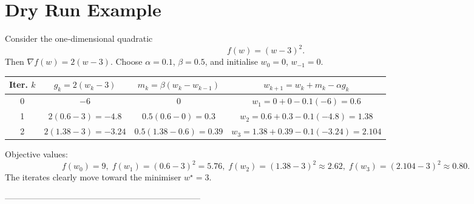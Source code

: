 \documentclass[11pt]{article}
\newcommand{\grad}{\nabla}
\begin{document}
\section*{Dry Run Example}
Consider the one‑dimensional quadratic
\[
f(w)=(w-3)^2 .
\]
Then $\grad f(w)=2(w-3)$.  
Choose $\alpha=0.1$, $\beta=0.5$, and initialise $w_0=0$, $w_{-1}=0$.

\begin{center}
\begin{tabular}{c|c|c|c}
\textbf{Iter. $k$} & $g_k=2(w_k-3)$ & $m_k=\beta (w_k-w_{k-1})$ & $w_{k+1}=w_k+m_k-\alpha g_k$ \\ \hline
0 & $-6$ & $0$ & $w_1=0+0-0.1(-6)=0.6$ \\
1 & $2(0.6-3)=-4.8$ & $0.5(0.6-0)=0.3$ & $w_2=0.6+0.3-0.1(-4.8)=1.38$ \\
2 & $2(1.38-3)=-3.24$ & $0.5(1.38-0.6)=0.39$ & $w_3=1.38+0.39-0.1(-3.24)=2.104$ 
\end{tabular}
\end{center}

Objective values:
\[
f(w_0)=9,\; f(w_1)=(0.6-3)^2=5.76,\; f(w_2)=(1.38-3)^2\approx2.62,\; f(w_3)=(2.104-3)^2\approx0.80 .
\]
The iterates clearly move toward the minimiser $w^\star=3$.

---------------------------------------------------------------------

\newpage
\end{document}
